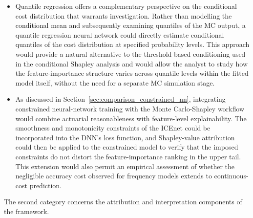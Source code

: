 \begin{itemize}
    \item Quantile regression offers a complementary perspective on the
          conditional cost distribution that warrants investigation.
          Rather than modelling the conditional mean and subsequently
          examining quantiles of the MC output, a quantile
          regression neural network could directly estimate conditional
          quantiles of the cost distribution at specified probability
          levels.  This approach would provide a natural alternative to
          the threshold-based conditioning used in the conditional Shapley
          analysis and would allow the analyst to study how the
          feature-importance structure varies across quantile levels
          within the fitted model itself, without the need for a separate
          MC simulation stage.

    \item As discussed in
          Section~\ref{sec:comparison_constrained_nn}, integrating
          constrained neural-network training with the Monte
          Carlo-Shapley workflow would combine actuarial reasonableness
          with feature-level explainability.  The smoothness and
          monotonicity constraints of the ICEnet
          \citep{richman2024icenet} could be incorporated into the
          DNN's loss function, and Shapley-value attribution could then
          be applied to the constrained model to verify that the imposed
          constraints do not distort the feature-importance ranking in
          the upper tail.  This extension would also permit an empirical
          assessment of whether the negligible accuracy cost observed for
          frequency models extends to continuous-cost prediction.
\end{itemize}

The second category concerns the attribution and interpretation
components of the framework.

